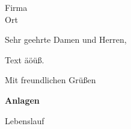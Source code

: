 \documentclass[paper=a4,fontsize=11pt,parskip=half-,fromalign=left,fromphone=true,fromemail=true,
  backaddress=underlined,foldmarks=false,enlargefirstpage=true,firstfoot=false]{scrlttr2}
\begin{document}
\begin{letter}{Firma\\Ort}
\opening{Sehr geehrte Damen und Herren,}
Text äöüß.
\closing{Mit freundlichen Grüßen}
\par\bigskip\textbf{Anlagen}\par
Lebenslauf\par
\end{letter}
\end{document}
